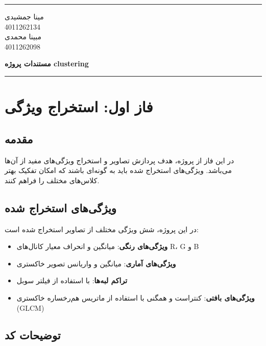 \documentclass[a4paper,12pt]{article}
\newcommand{\StudentOne}{4011262134}
\newcommand{\StudentTwo}{4011262098}
\newcommand{\NameOne}{مینا جمشیدی}
\newcommand{\NameTwo}{مبینا محمدی}
\newcommand{\ProjectName}{مستندات پروژه clustering}
\let\nobreaksection\section
\renewcommand{\section}{\nobreaksection}  %
\begin{document}
	

	\hrule \medskip
	\begin{minipage}{0.3\textwidth}
		\raggedright
		\small
		\NameOne \\
		\StudentOne \\
		\NameTwo \\
		\StudentTwo
	\end{minipage}
	\begin{minipage}{0.4\textwidth} 
		\centering 
		\large\bfseries
		\ProjectName \\
	\end{minipage}
	\begin{minipage}{0.3\textwidth}
		\raggedleft
		\small
	\end{minipage}
	\medskip\hrule 
	\vspace*{1.5cm}  
	



	\section{فاز اول: استخراج ویژگی}
	\subsection{مقدمه}
	در این فاز از پروژه، هدف پردازش تصاویر و استخراج ویژگی‌های مفید از آن‌ها می‌باشد. ویژگی‌های استخراج شده باید به گونه‌ای باشند که امکان تفکیک بهتر کلاس‌های مختلف را فراهم کنند.
	
	\subsection{ویژگی‌های استخراج شده}
	در این پروژه، شش ویژگی مختلف از تصاویر استخراج شده است:
	\begin{itemize}
		\item \textbf{ویژگی‌های رنگی}: میانگین و انحراف معیار کانال‌های R، G و B
		\item \textbf{ویژگی‌های آماری}: میانگین و واریانس تصویر خاکستری
		\item \textbf{تراکم لبه‌ها}: با استفاده از فیلتر سوبل
		\item \textbf{ویژگی‌های بافتی}: کنتراست و همگنی با استفاده از ماتریس هم‌رخساره خاکستری (GLCM)
	\end{itemize}
	
	\subsection{توضیحات کد}
\end{document}
